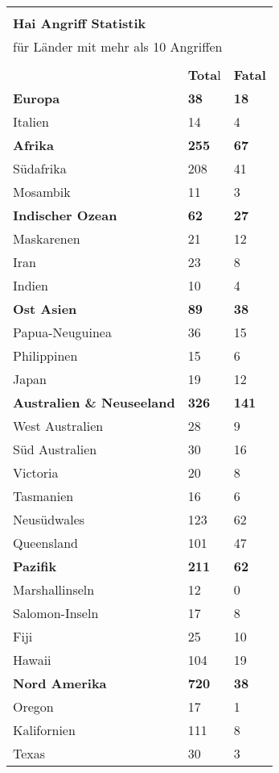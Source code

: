 
{\sf \footnotesize
  \begin{tabular}{|p{2.5cm}p{0.7cm}p{0.7cm}|}
    \hline
    & & \\
    \multicolumn{3}{|l|}{\textbf{Hai Angriff Statistik}} \\
    \multicolumn{3}{|l|}{für Länder mit mehr als 10 Angriffen} \\
    & & \\
    & \textbf{Tota}l & \textbf{Fatal} \\
    \textbf{Europa} & \textbf{38} & \textbf{18} \\
    Italien & 14 & 4 \\
    \textbf{Afrika} & \textbf{255} & \textbf{67} \\
    Südafrika & 208 & 41 \\
    Mosambik & 11 & 3 \\
    \textbf{Indischer Ozean} & \textbf{62} & \textbf{27} \\
    Maskarenen & 21 & 12 \\
    Iran & 23 & 8 \\
    Indien & 10 & 4 \\
    \textbf{Ost Asien} & \textbf{89} & \textbf{38} \\
    Papua-Neuguinea & 36 & 15 \\
    Philippinen & 15 & 6 \\
    Japan & 19 & 12 \\
    \textbf{Australien \& Neuseeland} & \textbf{326} & \textbf{141} \\
    West Australien & 28 & 9 \\
    Süd Australien & 30 & 16 \\
    Victoria & 20 & 8 \\
    Tasmanien & 16 & 6 \\
    Neusüdwales & 123 & 62 \\
    Queensland & 101 & 47 \\
    \textbf{Pazifik} & \textbf{211} & \textbf{62} \\
    Marshallinseln & 12 & 0 \\
    Salomon-Inseln & 17 & 8 \\
    Fiji & 25 & 10 \\
    Hawaii & 104 & 19 \\
    \textbf{Nord Amerika} & \textbf{720} & \textbf{38} \\
    Oregon & 17 & 1 \\
    Kalifornien & 111 & 8 \\
    Texas & 30 & 3 \\

\end{tabular}}
